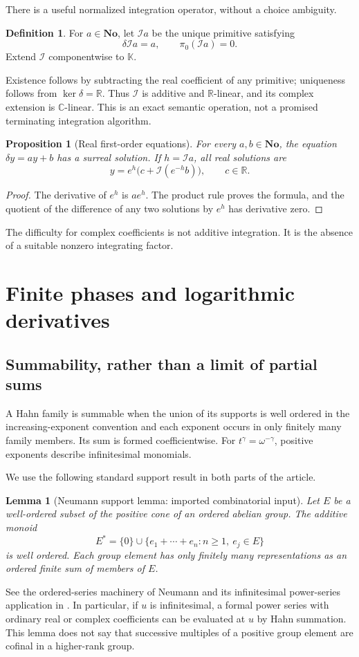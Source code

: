 \documentclass[11pt,letterpaper]{article}
\numberwithin{equation}{section}
\newtheorem{lemma}[theorem]{Lemma}
\newtheorem{proposition}[theorem]{Proposition}
\theoremstyle{definition}
\newtheorem{definition}[theorem]{Definition}
\theoremstyle{remark}
\newcommand{\No}{\mathbf{No}}
\newcommand{\K}{\mathbb K}
\newcommand{\R}{\mathbb R}
\newcommand{\C}{\mathbb C}
\newcommand{\Iop}{\mathcal I}
\begin{document}
There is a useful normalized integration operator, without a choice ambiguity.
\begin{definition}\label{def:integral}
For $a\in\No$, let $\Iop a$ be the unique primitive satisfying
\[
 \delta\Iop a=a,\qquad \pi_0(\Iop a)=0.
\]
Extend $\Iop$ componentwise to $\K$.
\end{definition}
Existence follows by subtracting the real coefficient of any primitive; uniqueness follows from $\ker\delta=\R$. Thus $\Iop$ is additive and $\R$-linear, and its complex extension is $\C$-linear. This is an exact semantic operation, not a promised terminating integration algorithm.

\begin{proposition}[Real first-order equations]\label{prop:realfirst}
For every $a,b\in\No$, the equation $\delta y=ay+b$ has a surreal solution. If $h=\Iop a$, all real solutions are
\[
 y=e^h\bigl(c+\Iop(e^{-h}b)\bigr),\qquad c\in\R.
\]
\end{proposition}
\begin{proof}
The derivative of $e^h$ is $ae^h$. The product rule proves the formula, and the quotient of the difference of any two solutions by $e^h$ has derivative zero.
\end{proof}
The difficulty for complex coefficients is not additive integration. It is the absence of a suitable nonzero integrating factor.

\section{Finite phases and logarithmic derivatives}\label{sec:phase}

\subsection{Summability, rather than a limit of partial sums}
A Hahn family is summable when the union of its supports is well ordered in the increasing-exponent convention and each exponent occurs in only finitely many family members. Its sum is formed coefficientwise. For $t^\gamma=\omega^{-\gamma}$, positive exponents describe infinitesimal monomials.

We use the following standard support result in both parts of the article.
\begin{lemma}[Neumann support lemma: imported combinatorial input]\label{lem:neumann}
Let $E$ be a well-ordered subset of the positive cone of an ordered abelian group. The additive monoid
\[
 E^*=\{0\}\cup\{e_1+\cdots+e_n:n\ge1,\ e_j\in E\}
\]
is well ordered. Each group element has only finitely many representations as an ordered finite sum of members of $E$.
\end{lemma}
See the ordered-series machinery of Neumann \cite{Neumann} and its infinitesimal power-series application in \cite[\S3]{BMComposition}. In particular, if $u$ is infinitesimal, a formal power series with ordinary real or complex coefficients can be evaluated at $u$ by Hahn summation. This lemma does not say that successive multiples of a positive group element are cofinal in a higher-rank group.
\end{document}
